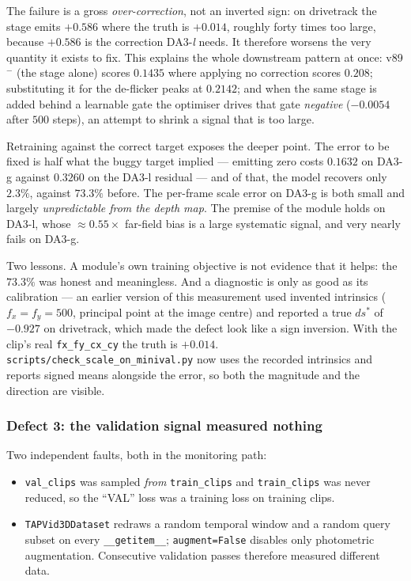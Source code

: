 \documentclass[11pt,a4paper]{article}
\begin{document}
The failure is a gross \emph{over-correction}, not an inverted sign: on drivetrack the stage emits
$+0.586$ where the truth is $+0.014$, roughly forty times too large, because $+0.586$ is the
correction DA3-\emph{l} needs. It therefore worsens the very quantity it exists to fix.
This explains the whole downstream pattern at once: v89$^{-}$ (the stage alone) scores $0.1435$
where applying no correction scores $0.208$; substituting it for the de-flicker peaks at $0.2142$;
and when the same stage is added behind a learnable gate the optimiser drives that gate
\emph{negative} ($-0.0054$ after $500$ steps), an attempt to shrink a signal that is too large.

Retraining against the correct target exposes the deeper point. The error to be fixed is half what
the buggy target implied --- emitting zero costs $0.1632$ on DA3-g against $0.3260$ on the DA3-l
residual --- and of that, the model recovers only $2.3\%$, against $73.3\%$ before. The per-frame
scale error on DA3-g is both small and largely \emph{unpredictable from the depth map}. The premise
of the module holds on DA3-l, whose $\approx 0.55\times$ far-field bias is a large systematic
signal, and very nearly fails on DA3-g.

Two lessons. A module's own training objective is not evidence that it helps: the $73.3\%$ was
honest and meaningless. And a diagnostic is only as good as its calibration --- an earlier version
of this measurement used invented intrinsics ($f_x=f_y=500$, principal point at the image centre)
and reported a true $ds^{*}$ of $-0.927$ on drivetrack, which made the defect look like a sign
inversion. With the clip's real \texttt{fx\_fy\_cx\_cy} the truth is $+0.014$.
\texttt{scripts/check\_scale\_on\_minival.py} now uses the recorded intrinsics and reports signed
means alongside the error, so both the magnitude and the direction are visible.

\subsubsection{Defect 3: the validation signal measured nothing}
\label{sec:dsr-val}

Two independent faults, both in the monitoring path:

\begin{itemize}
\item \texttt{val\_clips} was sampled \emph{from} \texttt{train\_clips} and \texttt{train\_clips} was
never reduced, so the ``VAL'' loss was a training loss on training clips.
\item \texttt{TAPVid3DDataset} redraws a random temporal window and a random query subset on every
\texttt{\_\_getitem\_\_}; \texttt{augment=False} disables only photometric augmentation. Consecutive
validation passes therefore measured different data.
\end{itemize}
\end{document}
